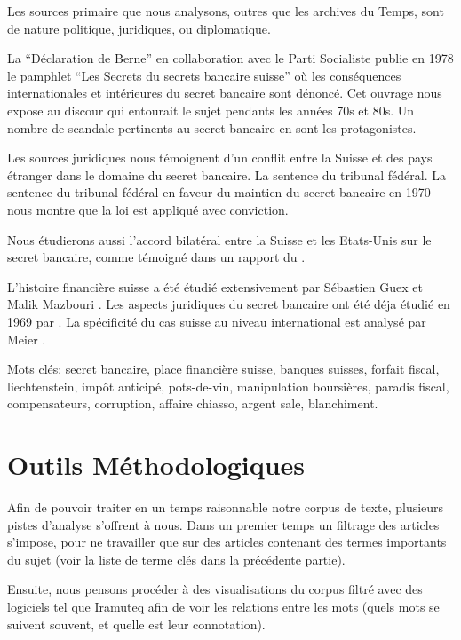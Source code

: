 \documentclass[11pt]{article}
\begin{document}
Les sources primaire que nous analysons, outres que les archives du Temps, sont
de nature politique, juridiques, ou diplomatique.

La “Déclaration de Berne” en collaboration avec le
Parti Socialiste publie en 1978 le pamphlet “Les Secrets du secrets bancaire
suisse” \citep{GiovanniniPierLuigi1978Lsds} où les conséquences internationales
et intérieures du secret bancaire sont dénoncé. Cet ouvrage nous expose au
discour qui entourait le sujet pendants les années 70s et 80s. Un nombre de
scandale pertinents au secret bancaire en sont les protagonistes.

Les sources juridiques nous témoignent d'un conflit entre la Suisse et des pays
étranger dans le domaine du secret bancaire. La sentence du tribunal fédéral. 
La sentence du tribunal fédéral \citep{tribunalFederal70} en faveur du maintien 
du secret bancaire en 1970 nous montre que la loi est appliqué avec conviction.

Nous étudierons aussi l'accord bilatéral entre la Suisse et les Etats-Unis sur
le secret bancaire, comme témoigné dans un rapport du \citet{insiderTrading83}.

L’histoire financière suisse a été étudié extensivement par Sébastien Guex et
Malik Mazbouri \citep{Guex99} \citep{Guex00} \citep{Mazbouri12}.
Les aspects juridiques du secret bancaire ont été déja étudié en 1969
par \citet{Mueller69}.
La spécificité du cas suisse au niveau international est analysé par
Meier \citep{Meier12}.

Mots clés: secret bancaire, place financière suisse, banques suisses, forfait
fiscal, liechtenstein, impôt anticipé, pots-de-vin, manipulation boursières,
paradis fiscal, compensateurs, corruption, affaire chiasso, argent sale,
blanchiment.

\section{Outils Méthodologiques}

Afin de pouvoir traiter en un temps raisonnable notre corpus de texte, plusieurs
pistes d’analyse s’offrent à nous. Dans un premier temps un filtrage des
articles s’impose, pour ne travailler que sur des articles contenant des termes
importants du sujet (voir la liste de terme clés dans la précédente partie).

Ensuite, nous pensons procéder à des visualisations du corpus filtré avec des
logiciels tel que Iramuteq afin de voir les relations entre les mots (quels mots
se suivent souvent, et quelle est leur connotation).
\end{document}

